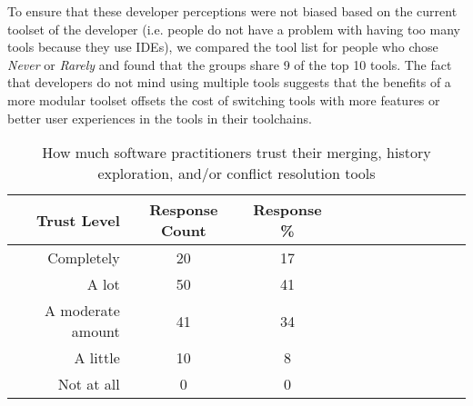 To ensure that these developer perceptions were not biased based on the current toolset of the developer (i.e. people do not have a problem with having too many tools because they use IDEs), we compared the tool list for people who chose \textit{Never} or \textit{Rarely} and found that the groups share 9 of the top 10 tools. The fact that developers do not mind using multiple tools suggests that the benefits of a more modular toolset offsets the cost of switching tools with more features or better user experiences in the tools in their toolchains. 

\begin{table}[!]
\renewcommand{\arraystretch}{1.3}
\caption{How much software practitioners trust their merging, history exploration, and/or conflict resolution tools}
\label{survey_tool_trust}
\centering
\begin{tabularx}{0.45\textwidth}{@{}r|*{10}{C}c@{}}
\toprule
Trust Level & Response Count & Response \%\\
\midrule
Completely & 20 & 17\\
A lot & 50 & 41\\
A moderate amount & 41 & 34\\
A little & 10 & 8\\
Not at all & 0 & 0\\
\bottomrule
\end{tabularx}
\end{table}

